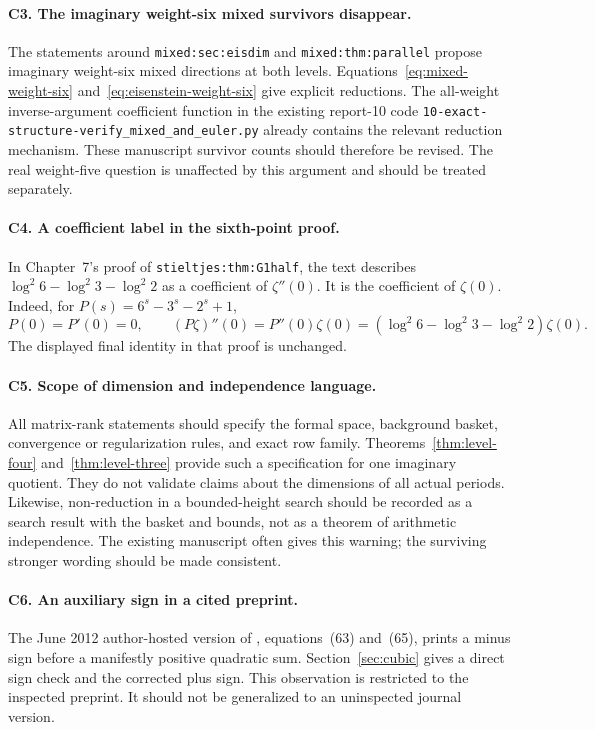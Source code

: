 \paragraph{C3. The imaginary weight-six mixed survivors disappear.}
The statements around \texttt{mixed:sec:eisdim} and
\texttt{mixed:thm:parallel} propose imaginary weight-six mixed
directions at both levels. Equations~\eqref{eq:mixed-weight-six}
and~\eqref{eq:eisenstein-weight-six} give explicit reductions.
The all-weight inverse-argument coefficient function in the existing
report-10 code
\texttt{10-exact-structure-verify\_mixed\_and\_euler.py}
already contains the relevant reduction mechanism.
These manuscript survivor counts should therefore be revised.
The real weight-five question is unaffected by this argument and
should be treated separately.

\paragraph{C4. A coefficient label in the sixth-point proof.}
In Chapter~7's proof of \texttt{stieltjes:\allowbreak thm:\allowbreak G1half}, the text
describes
\(\log^2 6-\log^2 3-\log^2 2\) as a coefficient of \(\zeta''(0)\).
It is the coefficient of \(\zeta(0)\).
Indeed, for \(P(s)=6^s-3^s-2^s+1\),
\[
 P(0)=P'(0)=0,\qquad
 (P\zeta)''(0)=P''(0)\zeta(0)
       =(\log^2 6-\log^2 3-\log^2 2)\zeta(0).
\]
The displayed final identity in that proof is unchanged.

\paragraph{C5. Scope of dimension and independence language.}
All matrix-rank statements should specify the formal space, background
basket, convergence or regularization rules, and exact row family.
Theorems~\ref{thm:level-four} and~\ref{thm:level-three} provide such
a specification for one imaginary quotient. They do not validate
claims about the dimensions of all actual periods. Likewise,
non-reduction in a bounded-height search should be recorded as a
search result with the basket and bounds, not as a theorem of
arithmetic independence. The existing manuscript often gives this
warning; the surviving stronger wording should be made consistent.

\paragraph{C6. An auxiliary sign in a cited preprint.}
The June 2012 author-hosted version of \cite{BBB}, equations~(63)
and~(65), prints a minus sign before a manifestly positive quadratic
sum. Section~\ref{sec:cubic} gives a direct sign check and the corrected
plus sign. This observation is restricted to the inspected preprint.
It should not be generalized to an uninspected journal version.

